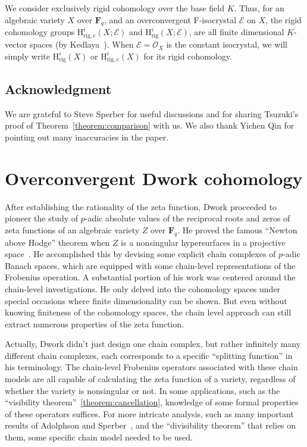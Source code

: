 \documentclass{amsart}
\numberwithin{equation}{section}
\theoremstyle{plain}
\theoremstyle{definition}
\renewcommand{\mathbb}{\mathbf}
\begin{document}
We consider exclusively rigid cohomology over the base field \(K\).
Thus, for an algebraic variety \(X\) over \(\mathbb{F}_{q}\), and an
overconvergent F-isocrystal \(\mathcal{E}\) on \(X\), the rigid
cohomology groups \(\mathrm{H}^{i}_{\mathrm{rig,c}}(X;\mathcal{E})\)
and \(\mathrm{H}^{i}_{\mathrm{rig}}(X;\mathcal{E})\), are all finite
dimensional \(K\)-vector spaces (by
Kedlaya~\cite{kedlaya:finiteness-rigid-cohomology}).  When
\(\mathcal{E}=\mathcal{O}_{X}\) is the constant isocrystal, we will
simply write \(\mathrm{H}^{i}_{\mathrm{rig}}(X)\) or
\(\mathrm{H}^{i}_{\mathrm{rig,c}}(X)\) for its rigid cohomology.



\subsection*{Acknowledgment}
We are grateful to Steve Sperber for useful discussions and for
sharing Tsuzuki's proof of Theorem~\ref{theorem:comparison} with us.
We also thank Yichen Qin for pointing out many inaccuracies in the
paper.



\section{Overconvergent Dwork cohomology}
\label{sec:exponential-model}
After establishing the rationality of the zeta function, Dwork proceeded
to pioneer the study of \(p\)-adic absolute values of the reciprocal roots and
zeros of zeta functions of an algebraic variety \(Z\) over \(\mathbb{F}_{q}\).
He proved the famous ``Newton above Hodge'' theorem when \(Z\)
is a nonsingular hypersurfaces in a projective
space~\cite{dwork:zeta-function-hypersurface-1}.
He accomplished this by devising some explicit chain complexes of
\(p\)-adic Banach spaces, which are equipped with some chain-level
representations of the Frobenius operation.  A substantial portion of
his work was centered around the chain-level investigations.  He only
delved into the cohomology spaces under special occasions where finite
dimensionality can be shown.  But even without knowing finiteness of
the cohomology spaces, the chain level approach can still extract
numerous properties of the zeta function.

Actually, Dwork didn't just design one chain complex, but rather
infinitely many different chain complexes, each corresponds to a
specific ``splitting function'' in his terminology.  The
chain-level Frobenius operators associated with these chain models are
all capable of calculating the zeta function of a variety, regardless
of whether the variety is nonsingular or not.  In some applications,
such as the ``visibility theorem''~\ref{theorem:cancellation},
knowledge of some formal properties of these operators suffices.  For
more intricate analysis, such as many important results of Adolphson
and
Sperber~\cite{adolphson-sperber:chevalley-warning,adolphson-sperber:newton-polyhedra-degree-l-function,adolphson-sperber:exponential-sums-newton-polyhedra},
and the ``divisibility theorem'' that relies on them, some
specific chain model needed to be used.
\end{document}
